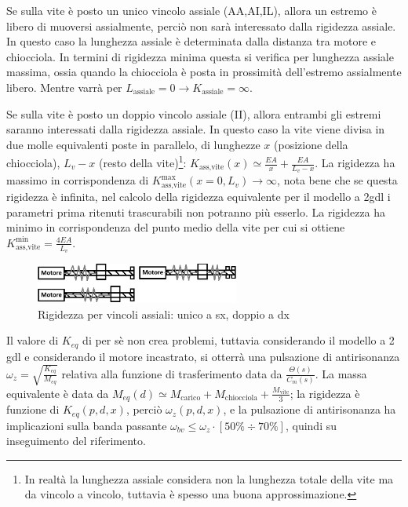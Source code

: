 Se sulla vite è posto un unico vincolo assiale (AA,AI,IL), allora un estremo è libero di muoversi assialmente, perciò non sarà interessato dalla rigidezza assiale.
In questo caso la lunghezza assiale è determinata dalla distanza tra motore e chiocciola.
In termini di rigidezza minima questa si verifica per lunghezza assiale massima, ossia quando la chiocciola è posta in prossimità dell'estremo assialmente libero.
Mentre varrà per \(L_\text{assiale} = 0 \rightarrow K_\text{assiale}=\infty\).

Se sulla vite è posto un doppio vincolo assiale (II), allora entrambi gli estremi saranno interessati dalla rigidezza assiale.
In questo caso la vite viene divisa in due molle equivalenti poste in parallelo, di lunghezze \(x\) (posizione della chiocciola), \(L_v - x\) (resto della vite)\footnote{In realtà la lunghezza assiale considera non la lunghezza totale della vite ma da vincolo a vincolo, tuttavia è spesso una buona approssimazione.}: \(K_\text{ass,vite}(x) \simeq \frac{EA}{x} + \frac{EA}{L_v - x} \).
La rigidezza ha massimo in corrispondenza di \( K_\text{ass,vite}^\text{max} (x=0,L_v) \rightarrow \infty \), nota bene che se questa rigidezza è infinita, nel calcolo della rigidezza equivalente per il modello a 2gdl i parametri prima ritenuti trascurabili non potranno più esserlo.
La rigidezza ha minimo in corrispondenza del punto medio della vite per cui si ottiene \(K_\text{ass,vite}^\text{min} = \frac{4EA}{L_v} \).

\begin{figure}[h]
    \centering
    \includegraphics[width=0.6\textwidth]{Immagini/rigidezza_ass_1vs2_vincoli.png}
    \caption{Rigidezza per vincoli assiali: unico a sx, doppio a dx}
\end{figure}

Il valore di \(K_{eq}\) di per sè non crea problemi, tuttavia considerando il modello a 2 gdl e considerando il motore incastrato, si otterrà una pulsazione di antirisonanza \(\omega_z = \sqrt{\frac{K_{eq}}{M_{eq}}}\) relativa alla funzione di trasferimento data da \( \frac{\Theta(s)}{C_m(s)} \).
La massa equivalente è data da \( M_{eq}(d) \simeq M_\text{carico} + M_\text{chiocciola} + \frac{M_\text{vite}}{3} \); la rigidezza è funzione di \( K_{eq}(p,d,x) \), perciò \(\omega_z (p,d,x)\), e la pulsazione di antirisonanza ha implicazioni sulla banda passante \( \omega_{bv} \leqslant \omega_z \cdot [50\% \div 70\%] \), quindi su inseguimento del riferimento.

